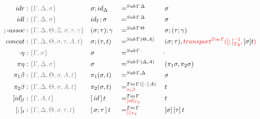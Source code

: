 \documentclass[a4paper,UKenglish,numberwithinsect,cleveref,thm-restate]{lipics-v2021}
\begin{document}
\begin{alignat*}{5}
  \mathsf{idr}    & : \implicit{\Gamma, \Delta, \sigma} && {\sigma ; \idS_{\Delta}} && =^{\Sub\,\Gamma\,\Delta} && {\sigma} \\
  \mathsf{idl}    & : \implicit{\Gamma, \Delta, \sigma} && {\idS_{\Gamma} ; \sigma} && =^{\Sub\,\Gamma\,\Delta} && {\sigma} \\
  ;\text{-}\mathsf{assoc} & : \implicit{\Gamma, \Delta, \Theta, \Xi, \sigma, \tau, \gamma} && (\sigma ; \tau) ; \gamma && =^{\Sub\,\Gamma\,\Theta} &&  \sigma ; (\tau ; \gamma) \\
  \mathsf{concat} & : \implicit{\Gamma, \Delta, \Theta, \sigma, \tau, A, t} && \sigma ; (\tau , t)      && =^{\Sub\,\Gamma\,(\Theta, A)} &&  (\sigma ; \tau) , \alert{\transfib{\Tm\,\Gamma}{[;]_{\Ty}^{-1}}{\color{black}[ \sigma ] t}} \\
  \emptyctx\eta   & : \implicit{\Gamma, \sigma} && \sigma                   && =^{\Sub\,\Gamma\,\emptyctx} & \emptysub \\
  \pi\eta         & : \implicit{\Gamma, \Delta, \sigma} && \sigma                   && =^{\Sub\,\Gamma\,(\Delta, A)} &&  (\pi_1 \sigma, \pi_2 \sigma) \\
  \pi_1\beta      & : \implicit{\Gamma, \Delta, \Theta, \sigma, A, t} && \pi_1(\sigma , t)        && =^{\Sub\,\Gamma,\Delta} &&  \sigma \\
  \pi_2\beta      & : \implicit{\Gamma, \Delta, \Theta, \sigma, A, t} && \pi_2(\sigma , t)        && =^{\Tm\,\Gamma\,([\blank]\,A)}_{\alert{\pi_1\beta}} &&  t \\
  [\idS]_t         & : \implicit{\Gamma, A, t} && {[\,\idS\,]\,t}          && =^{\Tm\,\Gamma}_{\alert{[\idS]_\Ty}}  && t \\
  [;]_t            & : \implicit{\Gamma, \Delta, \Theta, \sigma, \tau, t} && {[\,\sigma ; \tau\,]\,t} && =^{\Tm\,\Gamma}_{\alert{[;]_{\Ty}}}   && {[ \sigma ]\,[ \tau ]\,t} \\
\end{alignat*}
\end{document}
